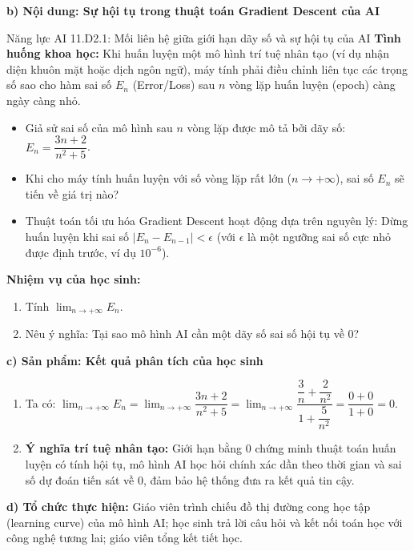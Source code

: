 \documentclass[12pt, a4paper]{article}
\begin{document}
\noindent \textbf{b) Nội dung: Sự hội tụ trong thuật toán Gradient Descent của AI}
\begin{aibox}{Năng lực AI 11.D2.1: Mối liên hệ giữa giới hạn dãy số và sự hội tụ của AI}
\textbf{Tình huống khoa học:} Khi huấn luyện một mô hình trí tuệ nhân tạo (ví dụ nhận diện khuôn mặt hoặc dịch ngôn ngữ), máy tính phải điều chỉnh liên tục các trọng số sao cho hàm sai số $E_n$ (Error/Loss) sau $n$ vòng lặp huấn luyện (epoch) càng ngày càng nhỏ.
\begin{itemize}[leftmargin=0.6cm]
    \item Giả sử sai số của mô hình sau $n$ vòng lặp được mô tả bởi dãy số: $E_n = \dfrac{3n + 2}{n^2 + 5}$.
    \item Khi cho máy tính huấn luyện với số vòng lặp rất lớn ($n \to +\infty$), sai số $E_n$ sẽ tiến về giá trị nào?
    \item Thuật toán tối ưu hóa Gradient Descent hoạt động dựa trên nguyên lý: Dừng huấn luyện khi sai số $|E_n - E_{n-1}| < \epsilon$ (với $\epsilon$ là một ngưỡng sai số cực nhỏ được định trước, ví dụ $10^{-6}$).
\end{itemize}
\textbf{Nhiệm vụ của học sinh:}
\begin{enumerate}[leftmargin=0.6cm]
    \item Tính $\lim_{n \to +\infty} E_n$.
    \item Nêu ý nghĩa: Tại sao mô hình AI cần một dãy số sai số hội tụ về 0?
\end{enumerate}
\end{aibox}

\noindent \textbf{c) Sản phẩm: Kết quả phân tích của học sinh}
\begin{enumerate}[leftmargin=0.6cm]
    \item Ta có: $\lim_{n \to +\infty} E_n = \lim_{n \to +\infty} \dfrac{3n + 2}{n^2 + 5} = \lim_{n \to +\infty} \dfrac{\dfrac{3}{n} + \dfrac{2}{n^2}}{1 + \dfrac{5}{n^2}} = \dfrac{0 + 0}{1 + 0} = 0$.
    \item \textbf{Ý nghĩa trí tuệ nhân tạo:} Giới hạn bằng $0$ chứng minh thuật toán huấn luyện có tính hội tụ, mô hình AI học hỏi chính xác dần theo thời gian và sai số dự đoán tiến sát về $0$, đảm bảo hệ thống đưa ra kết quả tin cậy.
\end{enumerate}

\noindent \textbf{d) Tổ chức thực hiện:}
Giáo viên trình chiếu đồ thị đường cong học tập (learning curve) của mô hình AI; học sinh trả lời câu hỏi và kết nối toán học với công nghệ tương lai; giáo viên tổng kết tiết học.
\end{document}
